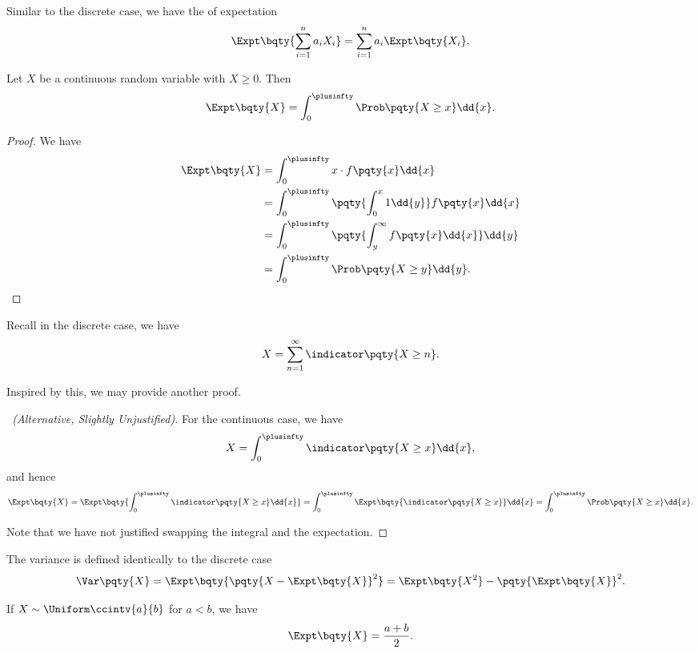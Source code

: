 Similar to the discrete case, we have the  of expectation
\[
    \Expt\bqty{\sum_{i = 1}^{n} a_i X_i} = \sum_{i = 1}^{n} a_i \Expt\bqty{X_i}.
\]

\begin{lemma}
    \label{lem:formula-expectation-non-negative-continuous-random-variable}
    Let \(X\) be a continuous random variable with \(X \geq 0\). Then
    \[
        \Expt\bqty{X} = \int_{0}^{\plusinfty} \Prob\pqty{X \geq x} \dd{x}.
    \]
\end{lemma}

\begin{proof}
    We have
    \begin{align*}
        \Expt\bqty{X} &= \int_{0}^{\plusinfty} x \cdot f\pqty{x} \dd{x} \\
        &= \int_{0}^{\plusinfty} \pqty{\int_{0}^{x} 1 \dd{y}} f\pqty{x} \dd{x} \\
        &= \int_{0}^{\plusinfty} \pqty{\int_{y}^{\infty} f\pqty{x} \dd{x}} \dd{y} \\
        &= \int_{0}^{\plusinfty} \Prob\pqty{X \geq y} \dd{y}. 
    \end{align*}
\end{proof}

Recall in the discrete case, we have
\[
    X = \sum_{n = 1}^{\infty} \indicator\pqty{X \geq n}.
\]

Inspired by this, we may provide another proof.

\begin{proof}[\proofname\ (Alternative, Slightly Unjustified)]
    For the continuous case, we have
    \[
        X = \int_{0}^{\plusinfty} \indicator\pqty{X \geq x} \dd{x},
    \]
    and hence
    \[
        \Expt\bqty{X} = \Expt\bqty{\int_{0}^{\plusinfty} \indicator\pqty{X \geq x} \dd{x}} = \int_{0}^{\plusinfty} \Expt\bqty{\indicator\pqty{X \geq x}} \dd{x} = \int_{0}^{\plusinfty} \Prob\pqty{X \geq x} \dd{x}.
    \]

    Note that we have not justified swapping the integral and the expectation.
\end{proof}

The variance is defined identically to the discrete case
\[
    \Var\pqty{X} = \Expt\bqty{\pqty{X - \Expt\bqty{X}}^2} = \Expt\bqty{X^2} - \pqty{\Expt\bqty{X}}^2.
\]

\begin{proposition}
    \label{prop:expt-uniform}%
    If \(X \sim \Uniform\ccintv{a}{b}\) for \(a < b\), we have
    \[
        \Expt\bqty{X} = \frac{a + b}{2}.
    \]
\end{proposition}

